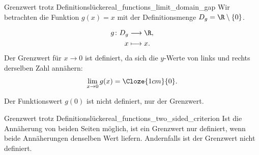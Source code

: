 \begin{ExampleBox}{Grenzwert trotz Definitionslücke}{real_functions_limit_domain_gap}
  Wir betrachten die Funktion $g(x)=x$ mit der Definitionsmenge
  $D_g=\R\setminus\{0\}$.
  \par\smallskip\noindent
  \begin{minipage}[c]{0.48\linewidth}
    \[
      \begin{aligned}
        g\colon D_g&\longrightarrow\R,\\
        x&\longmapsto x.
      \end{aligned}
    \]
    Der Grenzwert für $x\to0$ ist definiert, da sich die $y$-Werte
    von links und rechts derselben Zahl annähern:
    \[
      \lim_{x\to0}g(x)=\Cloze{1cm}{0}.
    \]
  \end{minipage}\hfill
  \begin{minipage}[c]{0.47\linewidth}
    \centering
  \end{minipage}
  \par\medskip
  Der Funktionswert $g(0)$ ist nicht definiert, nur der Grenzwert.
\end{ExampleBox}
%
\begin{KeyPointBox}[before skip=0.3\baselineskip]{Grenzwert trotz Definitionslücke}{real_functions_two_sided_criterion}
  Ist die Annäherung von beiden Seiten möglich, ist ein Grenzwert
  nur definiert, wenn beide Annäherungen denselben Wert liefern.
  Andernfalls ist der Grenzwert nicht definiert.
\end{KeyPointBox}

